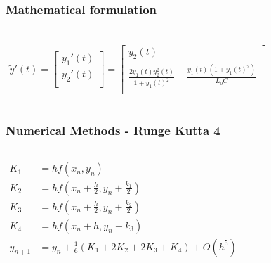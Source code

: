 \documentclass[aspectratio=1610]{beamer}
\begin{document}
\begin{frame}
\frametitle{Mathematical formulation}
\begin{columns}
\column{37em}
\huge
\begin{align*}\\
\tilde{y}'(t) =
\begin{bmatrix}
y_{1}'(t) \\ 
y_{2}'(t) \\
\end{bmatrix}
= \begin{bmatrix}
y_{2}(t)\\
\frac{2y_{1}(t)y_{2}^{2}(t)}{1+y_{1}(t)^2}-\frac{y_{1}(t)\left(1+y_{1}(t)^{2}\right)}{L_{0}C}\\
\end{bmatrix}
\end{align*}
\end{columns}
\end{frame}
\begin{frame}
\frametitle{Numerical Methods - Runge Kutta 4}
\begin{columns}
\column{2em}
\Large
  \begin{align*}
  K_{1}&=hf(x_{n},y_{n})\\
  K_{2}&=hf(x_{n}+\frac{h}{2},y_{n}+\frac{k_{1}}{2})\\
  K_{3}&=hf(x_{n}+\frac{h}{2},y_{n}+\frac{k_{2}}{2})\\
  K_{4}&=hf(x_{n}+h,y_{n}+k_{3})\\
  y_{n+1}&=y_{n}+\frac{1}{6}\left(K_{1}+2K_{2}+2K_{3}+K_{4}\right)+O(h^{5})
  \end{align*}
\end{columns}
\end{frame}
\end{document}
